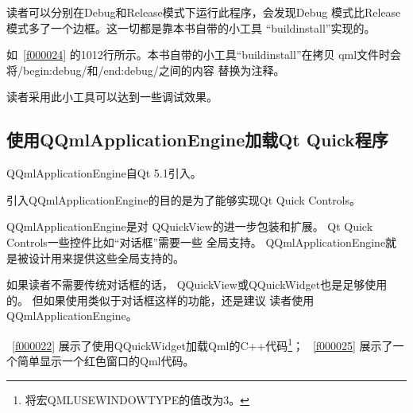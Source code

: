 读者可以分别在Debug和Release模式下运行此程序，会发现Debug
模式比Release模式多了一个边框。这一切都是靠本书自带的小工具
“build\underline{\hspace{0.5em}}install”实现的。

如\filesourcenumbernameone\ \ref{f000024}
的10\raisebox{0.16ex}{\sourcefonttwo\~{}}12行所示。本书自带的小工具“build\underline{\hspace{0.5em}}install”在拷贝
qml文件时会将/\raisebox{-0.35ex}{\sourcefonttwo{}*}begin:debug\raisebox{-0.35ex}{\sourcefonttwo{}*}/和/\raisebox{-0.35ex}{\sourcefonttwo{}*}end:debug\raisebox{-0.35ex}{\sourcefonttwo{}*}/之间的内容
替换为注释。

读者采用此小工具可以达到一些调试效果。

\FloatBarrier
\subsection{
使用QQmlApplicationEngine加载Qt Quick程序
}\label{ss001210}


QQmlApplicationEngine自Qt 5.1引入。

引入QQmlApplicationEngine的目的是为了能够实现Qt Quick Controls。

QQmlApplicationEngine是对
QQuickView的进一步包装和扩展。
Qt Quick Controls一些控件比如“对话框”需要一些
全局支持。
QQmlApplicationEngine就是被设计用来提供这些全局支持的。

如果读者不需要传统对话框的话，
QQuickView或QQuickWidget也是足够使用的。
但如果使用类似于对话框这样的功能，还是建议
读者使用QQmlApplicationEngine。

\filesourcenumbernameone\ \ref{f000022}
展示了使用QQuickWidget加载Qml的C{\sourcefonttwo{}+}{\sourcefonttwo{}+}代码\footnote{
将宏QML\underline{\hspace{0.5em}}USE\underline{\hspace{0.5em}}WINDOW\underline{\hspace{0.5em}}TYPE的值改为3。
}；
\filesourcenumbernameone\ \ref{f000025}
展示了一个简单显示一个红色窗口的Qml代码。

